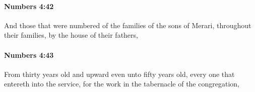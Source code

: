 		\paragraph{Numbers 4:42} %
			\label{NUMBERS-4-42}

			And those that were numbered of the families of the sons of Merari, throughout their families, by the house of their fathers,


		\paragraph{Numbers 4:43} %
			\label{NUMBERS-4-43}

			From thirty years old and upward even unto fifty years old, every one that entereth into the service, for the work in the tabernacle of the congregation,


